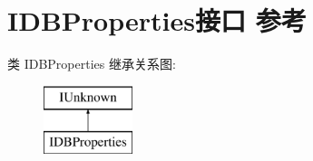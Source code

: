 \hypertarget{interface_i_d_b_properties}{}\section{I\+D\+B\+Properties接口 参考}
\label{interface_i_d_b_properties}
类 I\+D\+B\+Properties 继承关系图\+:\begin{figure}[H]
\begin{center}
\leavevmode
\includegraphics[height=2.000000cm]{interface_i_d_b_properties}
\end{center}
\end{figure}
